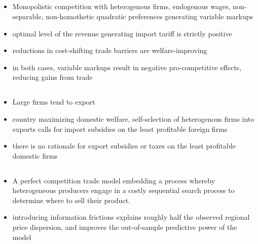 \documentclass[10pt]{article} %
\begin{document}
    \subsection{\cite{Demidova2017}}
    \begin{itemize}
        \item Monopolistic competition with heterogenous firms, endogenous wages, non-separable, non-homothetic quadratic preferences generating variable markups
        \item optimal level of the revenue generating import tariff is strictly positive
        \item reductions in cost-shifting trade barriers are welfare-improving
        \item in both cases, variable markups result in negative pro-competitive effects, reducing gains from trade
    \end{itemize}

    \subsection{\cite{CostinotRodriguezClareIvan2020}}
    \begin{itemize}
        \item Large firms tend to export
        \item country maximizing domestic welfare, self-selection of heterogenous firms into exports calls for import subsidies on the least profitable foreign firms
        \item there is no rationale for export subsidies or taxes on the least profitable domestic firms
    \end{itemize}

    \subsection{\cite{AtkesonBurstein2008}}

    \subsection{\cite{Allen2014}}
    \begin{itemize}
        \item A perfect competition trade model embedding a process whereby heterogeneous producers engage in a costly sequential search process to determine where to sell their product.
        \item introducing information frictions explains roughly half the observed regional price dispersion, and improves the out-of-sample predictive power of the model
    \end{itemize}
\end{document}
